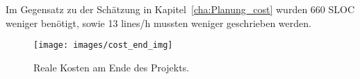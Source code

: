 Im Gegensatz zu der Schätzung in Kapitel~\ref{cha:Planung_cost} wurden 660 SLOC weniger benötigt, sowie 13 lines/h mussten weniger geschrieben werden.

\begin{figure}[hbt]
	\centering
	\texttt{[image: images/cost\_end\_img]}
	\caption[Kosten Realität]{Reale Kosten am Ende des Projekts.}
	\label{fig:cost_end}
\end{figure}